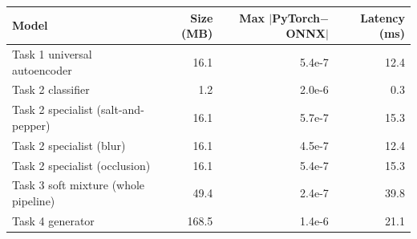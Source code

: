 \begin{tabular}{lrrr}
\toprule
Model & Size (MB) & Max $|$PyTorch$-$ONNX$|$ & Latency (ms) \\
\midrule
Task 1 universal autoencoder & 16.1 & 5.4e-7 & 12.4 \\
Task 2 classifier & 1.2 & 2.0e-6 & 0.3 \\
Task 2 specialist (salt-and-pepper) & 16.1 & 5.7e-7 & 15.3 \\
Task 2 specialist (blur) & 16.1 & 4.5e-7 & 12.4 \\
Task 2 specialist (occlusion) & 16.1 & 5.4e-7 & 15.3 \\
Task 3 soft mixture (whole pipeline) & 49.4 & 2.4e-7 & 39.8 \\
Task 4 generator & 168.5 & 1.4e-6 & 21.1 \\
\bottomrule
\end{tabular}
